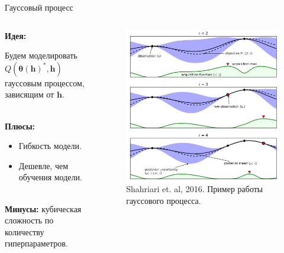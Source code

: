 \documentclass[usenames,dvipsnames,10pt,pdf,utf8,russian,aspectratio=43]{beamer}
\begin{document}
\begin{frame}{Гауссовый процесс}

\begin{columns}
\begin{column}{0.5\textwidth}
\textbf{Идея:}

Будем моделировать $Q(\boldsymbol{\theta}(\mathbf{h})^{*}, \mathbf{h})$ гауссовым процессом, зависящим от $\mathbf{h}$.

~\\
\textbf{Плюсы:}
\begin{itemize}
\item Гибкость модели.
\item Дешевле, чем обучения модели.
\end{itemize}

~\\
\textbf{Минусы:} кубическая сложность по количеству гиперпараметров.

\end{column}
\begin{column}{0.4\textwidth}
\begin{figure}[h]
\includegraphics[width=\textwidth]{./gp.png}
\caption*{Shahriari et. al, 2016. Пример работы гауссового процесса.}
\end{figure}

\end{column}
\end{columns}
\end{frame}
\end{document}
